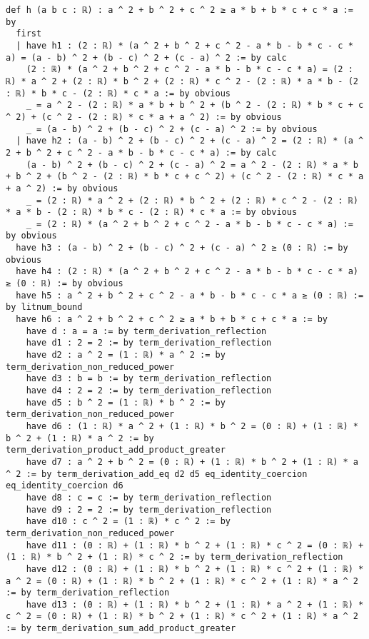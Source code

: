 \documentclass{article}
\begin{document}
\begin{tcolorbox}[colback=white!10, width=\linewidth]
\begin{lstlisting}[language=Lean4]
def h (a b c : ℝ) : a ^ 2 + b ^ 2 + c ^ 2 ≥ a * b + b * c + c * a := by
  first
  | have h1 : (2 : ℝ) * (a ^ 2 + b ^ 2 + c ^ 2 - a * b - b * c - c * a) = (a - b) ^ 2 + (b - c) ^ 2 + (c - a) ^ 2 := by calc
    (2 : ℝ) * (a ^ 2 + b ^ 2 + c ^ 2 - a * b - b * c - c * a) = (2 : ℝ) * a ^ 2 + (2 : ℝ) * b ^ 2 + (2 : ℝ) * c ^ 2 - (2 : ℝ) * a * b - (2 : ℝ) * b * c - (2 : ℝ) * c * a := by obvious
    _ = a ^ 2 - (2 : ℝ) * a * b + b ^ 2 + (b ^ 2 - (2 : ℝ) * b * c + c ^ 2) + (c ^ 2 - (2 : ℝ) * c * a + a ^ 2) := by obvious
    _ = (a - b) ^ 2 + (b - c) ^ 2 + (c - a) ^ 2 := by obvious
  | have h2 : (a - b) ^ 2 + (b - c) ^ 2 + (c - a) ^ 2 = (2 : ℝ) * (a ^ 2 + b ^ 2 + c ^ 2 - a * b - b * c - c * a) := by calc
    (a - b) ^ 2 + (b - c) ^ 2 + (c - a) ^ 2 = a ^ 2 - (2 : ℝ) * a * b + b ^ 2 + (b ^ 2 - (2 : ℝ) * b * c + c ^ 2) + (c ^ 2 - (2 : ℝ) * c * a + a ^ 2) := by obvious
    _ = (2 : ℝ) * a ^ 2 + (2 : ℝ) * b ^ 2 + (2 : ℝ) * c ^ 2 - (2 : ℝ) * a * b - (2 : ℝ) * b * c - (2 : ℝ) * c * a := by obvious
    _ = (2 : ℝ) * (a ^ 2 + b ^ 2 + c ^ 2 - a * b - b * c - c * a) := by obvious
  have h3 : (a - b) ^ 2 + (b - c) ^ 2 + (c - a) ^ 2 ≥ (0 : ℝ) := by obvious
  have h4 : (2 : ℝ) * (a ^ 2 + b ^ 2 + c ^ 2 - a * b - b * c - c * a) ≥ (0 : ℝ) := by obvious
  have h5 : a ^ 2 + b ^ 2 + c ^ 2 - a * b - b * c - c * a ≥ (0 : ℝ) := by litnum_bound
  have h6 : a ^ 2 + b ^ 2 + c ^ 2 ≥ a * b + b * c + c * a := by
    have d : a = a := by term_derivation_reflection
    have d1 : 2 = 2 := by term_derivation_reflection
    have d2 : a ^ 2 = (1 : ℝ) * a ^ 2 := by term_derivation_non_reduced_power
    have d3 : b = b := by term_derivation_reflection
    have d4 : 2 = 2 := by term_derivation_reflection
    have d5 : b ^ 2 = (1 : ℝ) * b ^ 2 := by term_derivation_non_reduced_power
    have d6 : (1 : ℝ) * a ^ 2 + (1 : ℝ) * b ^ 2 = (0 : ℝ) + (1 : ℝ) * b ^ 2 + (1 : ℝ) * a ^ 2 := by term_derivation_product_add_product_greater
    have d7 : a ^ 2 + b ^ 2 = (0 : ℝ) + (1 : ℝ) * b ^ 2 + (1 : ℝ) * a ^ 2 := by term_derivation_add_eq d2 d5 eq_identity_coercion eq_identity_coercion d6
    have d8 : c = c := by term_derivation_reflection
    have d9 : 2 = 2 := by term_derivation_reflection
    have d10 : c ^ 2 = (1 : ℝ) * c ^ 2 := by term_derivation_non_reduced_power
    have d11 : (0 : ℝ) + (1 : ℝ) * b ^ 2 + (1 : ℝ) * c ^ 2 = (0 : ℝ) + (1 : ℝ) * b ^ 2 + (1 : ℝ) * c ^ 2 := by term_derivation_reflection
    have d12 : (0 : ℝ) + (1 : ℝ) * b ^ 2 + (1 : ℝ) * c ^ 2 + (1 : ℝ) * a ^ 2 = (0 : ℝ) + (1 : ℝ) * b ^ 2 + (1 : ℝ) * c ^ 2 + (1 : ℝ) * a ^ 2 := by term_derivation_reflection
    have d13 : (0 : ℝ) + (1 : ℝ) * b ^ 2 + (1 : ℝ) * a ^ 2 + (1 : ℝ) * c ^ 2 = (0 : ℝ) + (1 : ℝ) * b ^ 2 + (1 : ℝ) * c ^ 2 + (1 : ℝ) * a ^ 2 := by term_derivation_sum_add_product_greater

\end{lstlisting}
\end{tcolorbox}
\end{document}
